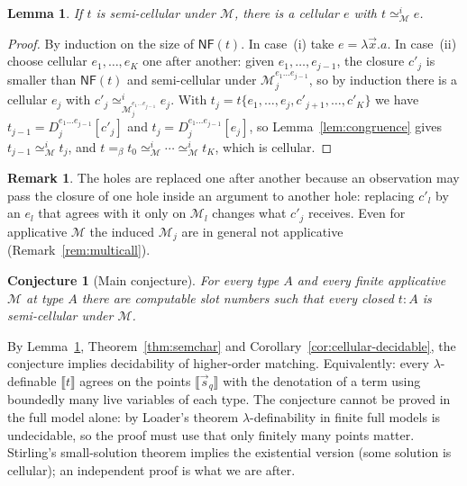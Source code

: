 \documentclass[11pt]{article}
\newcommand{\NF}{\mathsf{NF}\xspace}
\newcommand{\ObsEq}{\mathrel{\simeq}\xspace}
\newcommand{\sem}[1]{\llbracket #1\rrbracket}
\newtheorem{lemma}[theorem]{Lemma}
\newtheorem{conjecture}[theorem]{Conjecture}
\theoremstyle{definition}
\newtheorem{remark}[theorem]{Remark}
\begin{document}
\begin{lemma}\label{lem:semicell}
If $t$ is semi-cellular under $\mathcal M$, there is a cellular $e$ with
$t\ObsEq^i_{\mathcal M}e$.
\end{lemma}
\begin{proof}
By induction on the size of $\NF(t)$.  In case~(i) take
$e=\lambda\vec x.a$.  In case~(ii) choose cellular $e_1,\ldots,e_K$ one
after another: given $e_1,\ldots,e_{j-1}$, the closure $c'_j$ is smaller
than $\NF(t)$ and semi-cellular under $\mathcal M_j^{e_1\ldots e_{j-1}}$,
so by induction there is a cellular $e_j$ with
$c'_j\ObsEq^i_{\mathcal M_j^{e_1\ldots e_{j-1}}}e_j$.  With
$t_j=t\{e_1,\ldots,e_j,c'_{j+1},\ldots,c'_K\}$ we have
$t_{j-1}=D_j^{e_1\ldots e_{j-1}}[c'_j]$ and
$t_j=D_j^{e_1\ldots e_{j-1}}[e_j]$, so Lemma~\ref{lem:congruence} gives
$t_{j-1}\ObsEq^i_{\mathcal M}t_j$, and
$t=_\beta t_0\ObsEq^i_{\mathcal M}\cdots\ObsEq^i_{\mathcal M}t_K$, which
is cellular.
\end{proof}

\begin{remark}
The holes are replaced one after another because an observation may pass
the closure of one hole inside an argument to another hole: replacing
$c'_l$ by an $e_l$ that agrees with it only on $\mathcal M_l$ changes what
$c'_j$ receives.  Even for applicative $\mathcal M$ the induced
$\mathcal M_j$ are in general not applicative (Remark~\ref{rem:multicall}).
\end{remark}

\begin{conjecture}[Main conjecture]\label{conj:main}
For every type $A$ and every finite applicative $\mathcal M$ at type $A$
there are computable slot numbers such that every closed $t:A$ is
semi-cellular under $\mathcal M$.
\end{conjecture}

By Lemma~\ref{lem:semicell}, Theorem~\ref{thm:semchar} and
Corollary~\ref{cor:cellular-decidable}, the conjecture implies
decidability of higher-order matching.  Equivalently: every
$\lambda$-definable $\sem t$ agrees on the points $\sem{\vec s_q}$ with
the denotation of a term using boundedly many live variables of each
type.  The conjecture cannot be proved in the full model alone: by
Loader's theorem $\lambda$-definability in finite full models is
undecidable, so the proof must use that only finitely many points matter.
Stirling's small-solution theorem implies the existential version
(some solution is cellular); an independent proof is what we are after.
\end{document}
